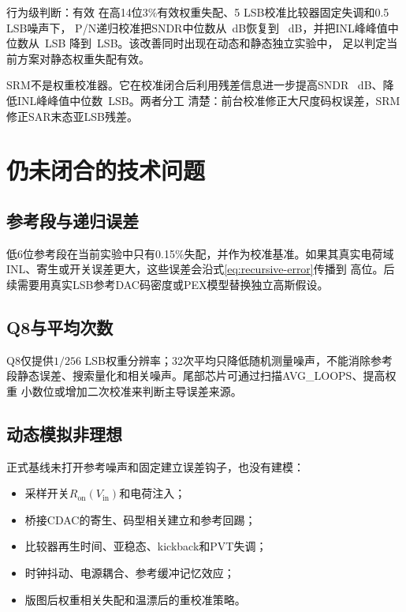 \documentclass[11pt,a4paper,UTF8,fontset=none,openany]{ctexrep}
\numberwithin{equation}{chapter}
\numberwithin{figure}{chapter}
\numberwithin{table}{chapter}
\begin{document}
\begin{passbox}{行为级判断：有效}
在高14位3\%有效权重失配、5 LSB校准比较器固定失调和0.5 LSB噪声下，
P/N递归校准把SNDR中位数从\NominalSndrMedian\ dB恢复到
\CalNoSrmSndrMedian\ dB，并把INL峰峰值中位数从\NominalInlMedian\ LSB
降到\CalNoSrmInlMedian\ LSB。该改善同时出现在动态和静态独立实验中，
足以判定当前方案对静态权重失配有效。
\end{passbox}

SRM不是权重校准器。它在校准闭合后利用残差信息进一步提高SNDR
\SrmSndrGain\ dB、降低INL峰峰值中位数\SrmInlReduction\ LSB。两者分工
清楚：前台校准修正大尺度码权误差，SRM修正SAR末态亚LSB残差。

\section{仍未闭合的技术问题}

\subsection{参考段与递归误差}

低6位参考段在当前实验中只有0.15\%失配，并作为校准基准。如果其真实电荷域
INL、寄生或开关误差更大，这些误差会沿式\eqref{eq:recursive-error}传播到
高位。后续需要用真实LSB参考DAC码密度或PEX模型替换独立高斯假设。

\subsection{Q8与平均次数}

Q8仅提供$1/256$ LSB权重分辨率；32次平均只降低随机测量噪声，不能消除参考
段静态误差、搜索量化和相关噪声。尾部芯片可通过扫描AVG\_LOOPS、提高权重
小数位或增加二次校准来判断主导误差来源。

\subsection{动态模拟非理想}

正式基线未打开参考噪声和固定建立误差钩子，也没有建模：

\begin{itemize}
  \item 采样开关$R_{\mathrm{on}}(V_{\mathrm{in}})$和电荷注入；
  \item 桥接CDAC的寄生、码型相关建立和参考回踢；
  \item 比较器再生时间、亚稳态、kickback和PVT失调；
  \item 时钟抖动、电源耦合、参考缓冲记忆效应；
  \item 版图后权重相关失配和温漂后的重校准策略。
\end{itemize}
\end{document}
